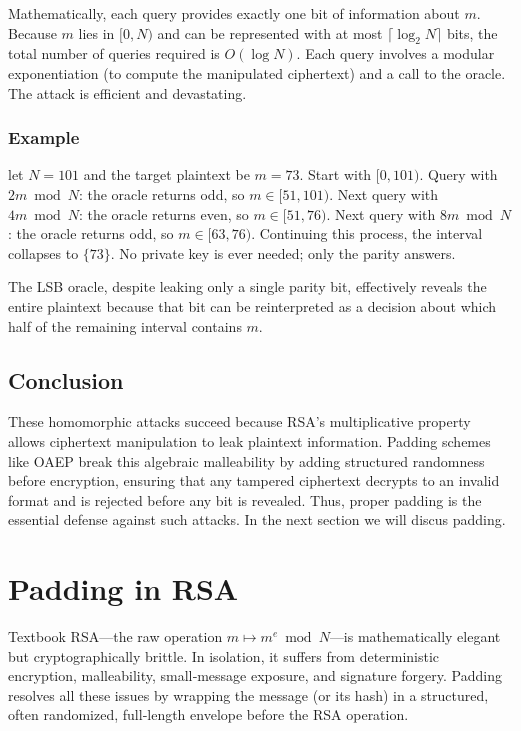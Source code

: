 Mathematically, each query provides exactly one bit of information about \(m\). Because \(m\) lies in \([0,N)\) and can be represented with at most \(\lceil \log_2 N\rceil\) bits, the total number of queries required is \(O(\log N)\). Each query involves a modular exponentiation (to compute the manipulated ciphertext) and a call to the oracle. The attack is efficient and devastating.

\subsubsection*{Example}
 
let \(N = 101\) and the target plaintext be \(m = 73\). Start with \([0,101)\). Query with \(2m \bmod N\): the oracle returns odd, so \(m \in [51,101)\). Next query with \(4m \bmod N\): the oracle returns even, so \(m \in [51,76)\). Next query with \(8m \bmod N\): the oracle returns odd, so \(m \in [63,76)\). Continuing this process, the interval collapses to \(\{73\}\). No private key is ever needed; only the parity answers.

\vspace{1em}
The LSB oracle, despite leaking only a single parity bit, effectively reveals the entire plaintext because that bit can be reinterpreted as a decision about which half of the remaining interval contains \(m\).
\vspace{2em}

\subsection*{ Conclusion}
These homomorphic attacks succeed because RSA’s multiplicative property allows ciphertext manipulation to leak plaintext information. Padding schemes like OAEP break this algebraic malleability by adding structured randomness before encryption, ensuring that any tampered ciphertext decrypts to an invalid format and is rejected before any bit is revealed. Thus, proper padding is the essential defense against such attacks. In the next section we will discus padding.  
\section{Padding in RSA}

Textbook RSA---the raw operation \( m \mapsto m^e \bmod N \)---is mathematically elegant but cryptographically brittle. In isolation, it suffers from deterministic encryption, malleability, small‑message exposure, and signature forgery. Padding resolves all these issues by wrapping the message (or its hash) in a structured, often randomized, full‑length envelope before the RSA operation.

